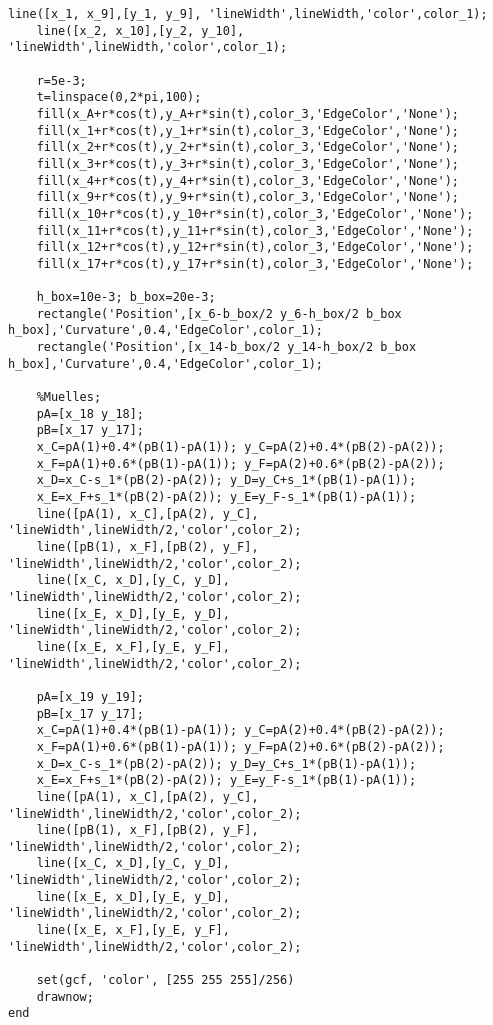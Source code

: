 \begin{lstlisting}[style=codematlab]
    line([x_1, x_9],[y_1, y_9], 'lineWidth',lineWidth,'color',color_1);
    line([x_2, x_10],[y_2, y_10], 'lineWidth',lineWidth,'color',color_1);
    
    r=5e-3;
    t=linspace(0,2*pi,100);
    fill(x_A+r*cos(t),y_A+r*sin(t),color_3,'EdgeColor','None');
    fill(x_1+r*cos(t),y_1+r*sin(t),color_3,'EdgeColor','None');
    fill(x_2+r*cos(t),y_2+r*sin(t),color_3,'EdgeColor','None');
    fill(x_3+r*cos(t),y_3+r*sin(t),color_3,'EdgeColor','None');
    fill(x_4+r*cos(t),y_4+r*sin(t),color_3,'EdgeColor','None');
    fill(x_9+r*cos(t),y_9+r*sin(t),color_3,'EdgeColor','None');
    fill(x_10+r*cos(t),y_10+r*sin(t),color_3,'EdgeColor','None');
    fill(x_11+r*cos(t),y_11+r*sin(t),color_3,'EdgeColor','None');
    fill(x_12+r*cos(t),y_12+r*sin(t),color_3,'EdgeColor','None');
    fill(x_17+r*cos(t),y_17+r*sin(t),color_3,'EdgeColor','None');

    h_box=10e-3; b_box=20e-3;
    rectangle('Position',[x_6-b_box/2 y_6-h_box/2 b_box h_box],'Curvature',0.4,'EdgeColor',color_1);
    rectangle('Position',[x_14-b_box/2 y_14-h_box/2 b_box h_box],'Curvature',0.4,'EdgeColor',color_1);
    
    %Muelles;
    pA=[x_18 y_18];
    pB=[x_17 y_17];
    x_C=pA(1)+0.4*(pB(1)-pA(1)); y_C=pA(2)+0.4*(pB(2)-pA(2));
    x_F=pA(1)+0.6*(pB(1)-pA(1)); y_F=pA(2)+0.6*(pB(2)-pA(2));
    x_D=x_C-s_1*(pB(2)-pA(2)); y_D=y_C+s_1*(pB(1)-pA(1));
    x_E=x_F+s_1*(pB(2)-pA(2)); y_E=y_F-s_1*(pB(1)-pA(1));
    line([pA(1), x_C],[pA(2), y_C], 'lineWidth',lineWidth/2,'color',color_2);
    line([pB(1), x_F],[pB(2), y_F], 'lineWidth',lineWidth/2,'color',color_2);
    line([x_C, x_D],[y_C, y_D], 'lineWidth',lineWidth/2,'color',color_2);
    line([x_E, x_D],[y_E, y_D], 'lineWidth',lineWidth/2,'color',color_2);
    line([x_E, x_F],[y_E, y_F], 'lineWidth',lineWidth/2,'color',color_2);
    
    pA=[x_19 y_19];
    pB=[x_17 y_17];
    x_C=pA(1)+0.4*(pB(1)-pA(1)); y_C=pA(2)+0.4*(pB(2)-pA(2));
    x_F=pA(1)+0.6*(pB(1)-pA(1)); y_F=pA(2)+0.6*(pB(2)-pA(2));
    x_D=x_C-s_1*(pB(2)-pA(2)); y_D=y_C+s_1*(pB(1)-pA(1));
    x_E=x_F+s_1*(pB(2)-pA(2)); y_E=y_F-s_1*(pB(1)-pA(1));
    line([pA(1), x_C],[pA(2), y_C], 'lineWidth',lineWidth/2,'color',color_2);
    line([pB(1), x_F],[pB(2), y_F], 'lineWidth',lineWidth/2,'color',color_2);
    line([x_C, x_D],[y_C, y_D], 'lineWidth',lineWidth/2,'color',color_2);
    line([x_E, x_D],[y_E, y_D], 'lineWidth',lineWidth/2,'color',color_2);
    line([x_E, x_F],[y_E, y_F], 'lineWidth',lineWidth/2,'color',color_2);
    
    set(gcf, 'color', [255 255 255]/256)
    drawnow;
end
\end{lstlisting}

